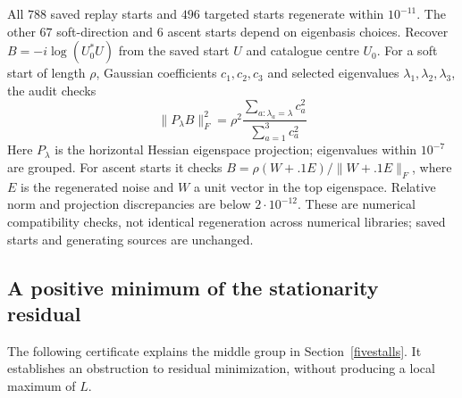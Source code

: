 \documentclass[11pt,a4paper]{article}
\begin{document}
All $788$ saved replay starts and $496$ targeted starts regenerate
within $10^{-11}$. The other $67$ soft-direction and $6$ ascent starts
depend on eigenbasis choices. Recover $B=-i\log(U_0^*U)$ from the saved
start $U$ and catalogue centre $U_0$. For a soft start of length $\rho$,
Gaussian coefficients $c_1,c_2,c_3$ and selected eigenvalues
$\lambda_1,\lambda_2,\lambda_3$, the audit checks
\[
 \|P_\lambda B\|_F^2
 =\rho^2\frac{\sum_{a:\lambda_a=\lambda}c_a^2}
                   {\sum_{a=1}^3c_a^2}
\]
Here $P_\lambda$ is the horizontal Hessian eigenspace projection;
eigenvalues within $10^{-7}$ are grouped. For ascent starts it checks
$B=\rho(W+.1E)/\|W+.1E\|_F$, where $E$ is the regenerated noise
and $W$ a unit vector in the top eigenspace. Relative norm and
projection discrepancies are below $2\cdot10^{-12}$. These are
numerical compatibility checks, not identical regeneration across
numerical libraries; saved starts and generating sources are unchanged.

\subsection{A positive minimum of the stationarity residual}
The following certificate explains the middle group in
Section~\ref{fivestalls}. It establishes an obstruction to residual
minimization, without producing a local maximum of $L$.
\end{document}
